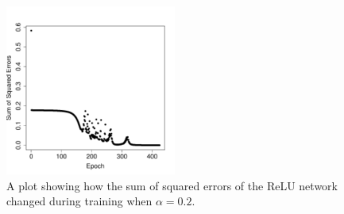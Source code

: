 \documentclass[xcolor={table}]{beamer}
\begin{document}
 \begin{frame} 
\begin{table}
\caption {The ReLU network's per example prediction, error, and the sum of squared errors after training has converged to an $SSE<0.0001$.}
\label{tab:nnReLUexampleerrorspost424weightupdate}
\noindent{}
\end{table}
\end{frame} 



 \begin{frame} 
\begin{figure}[t]
\centerline{
\includegraphics[width=0.5\textwidth]{./images/fmlpda_8_20.pdf}
}
\caption[A plot showing how the sum of squared errors of the ReLU network changed during training when $\alpha=0.2$.]{A plot showing how the sum of squared errors of the ReLU network changed during training when $\alpha=0.2$.}
\label{fig:SSEperTrainingIterationNNReLU}
\end{figure}
\end{frame} 
\end{document}
